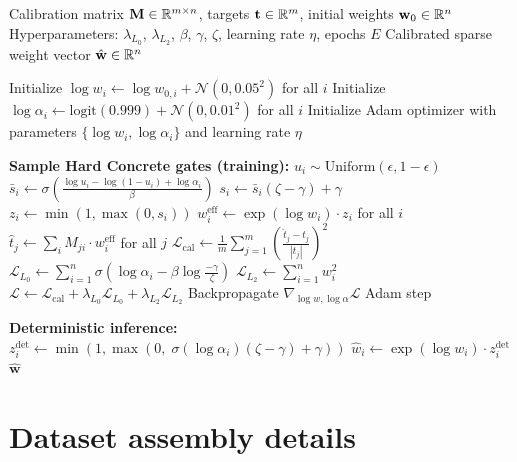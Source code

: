 \begin{algorithm}[ht]
\caption{$L_0$-regularized calibration with Hard Concrete gates}
\label{alg:l0}
\begin{algorithmic}[1]
\Require Calibration matrix $\mathbf{M} \in \mathbb{R}^{m \times n}$, targets $\mathbf{t} \in \mathbb{R}^m$, initial weights $\mathbf{w}_0 \in \mathbb{R}^n$
\Require Hyperparameters: $\lambda_{L_0}$, $\lambda_{L_2}$, $\beta$, $\gamma$, $\zeta$, learning rate $\eta$, epochs $E$
\Ensure Calibrated sparse weight vector $\hat{\mathbf{w}} \in \mathbb{R}^n$

\State Initialize $\log w_i \gets \log w_{0,i} + \mathcal{N}(0, 0.05^2)$ for all $i$
\State Initialize $\log \alpha_i \gets \text{logit}(0.999) + \mathcal{N}(0, 0.01^2)$ for all $i$
\State Initialize Adam optimizer with parameters $\{\log w_i, \log \alpha_i\}$ and learning rate $\eta$

    \State \textbf{Sample Hard Concrete gates (training):}
        \State $u_i \sim \text{Uniform}(\epsilon, 1-\epsilon)$
        \State $\bar{s}_i \gets \sigma\!\left(\frac{\log u_i - \log(1-u_i) + \log \alpha_i}{\beta}\right)$
        \State $s_i \gets \bar{s}_i(\zeta - \gamma) + \gamma$
        \State $z_i \gets \min(1, \max(0, s_i))$
    \EndFor
    \State $w_i^{\text{eff}} \gets \exp(\log w_i) \cdot z_i$ for all $i$
    \State $\hat{t}_j \gets \sum_i M_{ji} \cdot w_i^{\text{eff}}$ for all $j$
    \State $\mathcal{L}_{\text{cal}} \gets \frac{1}{m}\sum_{j=1}^{m}\left(\frac{\hat{t}_j - t_j}{|t_j|}\right)^2$
    \State $\mathcal{L}_{L_0} \gets \sum_{i=1}^{n} \sigma\!\left(\log \alpha_i - \beta \log \frac{-\gamma}{\zeta}\right)$
    \State $\mathcal{L}_{L_2} \gets \sum_{i=1}^{n} w_i^2$
    \State $\mathcal{L} \gets \mathcal{L}_{\text{cal}} + \lambda_{L_0} \mathcal{L}_{L_0} + \lambda_{L_2} \mathcal{L}_{L_2}$
    \State Backpropagate $\nabla_{\log w, \log \alpha} \mathcal{L}$
    \State Adam step
\EndFor

\State \textbf{Deterministic inference:}
    \State $z_i^{\text{det}} \gets \min\!\left(1, \max\!\left(0,\; \sigma(\log \alpha_i)(\zeta - \gamma) + \gamma\right)\right)$
    \State $\hat{w}_i \gets \exp(\log w_i) \cdot z_i^{\text{det}}$
\EndFor
\State \Return $\hat{\mathbf{w}}$
\end{algorithmic}
\end{algorithm}

\section{Dataset assembly details}
\label{app:assembly}

